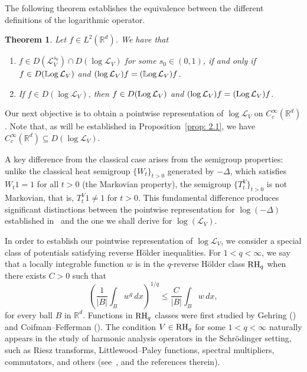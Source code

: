 \documentclass[10pt, a4paper, reqno]{amsart}
\newtheorem{thm}{Theorem}[section]
\theoremstyle{definition}
\theoremstyle{remark}
\DeclareMathOperator{\LLog}{\mathbb{L}\textup{og}}
\DeclareMathOperator{\Log}{\textup{Log}}
\newcommand{\RH}{\textup{RH}}
\numberwithin{equation}{section}
\begin{document}
The following theorem establishes the equivalence between the different definitions of the logarithmic operator.

\begin{thm}\label{thm: 1.1}
    Let $f \in L^2(\mathbb{R}^d)$. We have that
    \begin{enumerate}
        \item\label{item: teo 1.1 - a} $f \in D(\mathcal{L}_V^{s_0}) \cap D(\log \mathcal{L}_V)$ for some $s_0 \in (0,1)$, if and only if $f \in D(\LLog \mathcal{L}_V)$ and $(\log \mathcal{L}_V) f = (\LLog \mathcal{L}_V) f$.
        \item\label{item: teo 1.1 - b} If $f \in D(\log \mathcal{L}_V)$, then $f \in D(\Log \mathcal{L}_V)$ and $(\log \mathcal{L}_V) f = (\Log \mathcal{L}_V) f$.
    \end{enumerate}
\end{thm}

Our next objective is to obtain a pointwise representation of $\log \mathcal{L}_V$ on $C_c^\infty(\mathbb{R}^d)$. Note that, as will be established in Proposition~\ref{prop: 2.1}, we have $C_c^\infty(\mathbb{R}^d) \subseteq D(\log \mathcal{L}_V)$. 

A key difference from the classical case arises from the semigroup properties: unlike the classical heat semigroup $\{W_t\}_{t>0}$ generated by $-\Delta$, which satisfies $W_t 1 = 1$ for all $t > 0$ (the Markovian property), the semigroup $\{T_t^V\}_{t>0}$ is not Markovian, that is, $T_t^V 1 \neq 1$ for $t > 0$. This fundamental difference produces significant distinctions between the pointwise representation for $\log(-\Delta)$ established in~\cite[Theorem 1.1]{ChW} and the one we shall derive for $\log(\mathcal{L}_V)$.

In order to establish our pointwise representation of $\log \mathcal{L}_V$, we consider a special class of potentials satisfying reverse H\"older inequalities. For $1 < q < \infty$, we say that a locally integrable function $w$ is in the $q$-reverse H\"older class $\RH_q$ when there exists $C > 0$ such that
\begin{equation*}
    \left(\frac{1}{|B|} \int_B w^q \, dx\right)^{1/q} \leq \frac{C}{|B|} \int_B w \, dx,
\end{equation*}
for every ball $B$ in $\mathbb{R}^d$. Functions in $\RH_q$ classes were first studied by Gehring (\cite{G}) and Coifman--Fefferman (\cite{CF}). The condition $V \in \RH_q$ for some $1 < q < \infty$ naturally appears in the study of harmonic analysis operators in the Schr\"odinger setting, such as Riesz transforms, Littlewood--Paley functions, spectral multipliers, commutators, and others (see~\cite{BFHR, BHQ, Dz1, Dz2, DGMTZ, GHY, Shen95, ZT},
and the references therein). 
\end{document}

